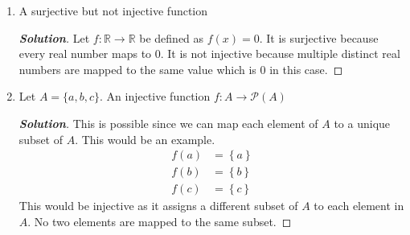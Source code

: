 \documentclass[11pt]{article}
\newenvironment{problem}[2][Problem\!]{\begin{trivlist}
\item[\hskip \labelsep {\bfseries #1}\hskip \labelsep {\bfseries #2.}]}{\end{trivlist}}
\newenvironment{solution}{\begin{proof}[\textbf{\textit{Solution}}]}{\end{proof}}
\newcommand{\set}[1]{\left\{#1\right\}} %
\begin{document}
\begin{problem}{8.1}
\begin{enumerate}
    \item [(d)] A surjective but not injective function
    \begin{solution}
    Let \(f: \mathbb{R} \to \mathbb{R}\) be defined as \(f(x) = 0\). It is surjective because every real number maps to \(0\). It is not injective because multiple distinct real numbers are mapped to the same value which is \(0\) in this case.
    \end{solution}
    \item [(e)] Let \(A = \{a,b,c\}\). An injective function \(f: A \to \mathcal{P}(A)\) 
    \begin{solution}
    This is possible since we can map each element of \(A\) to a unique subset of \(A\). This would be an example.
    \begin{align*}
        f(a) &= \set{a}\\
        f(b) &= \set{b}\\
        f(c) &= \set{c}
    \end{align*}
    This would be injective as it assigns a different subset of \(A\) to each element in \(A\). No two elements are mapped to the same subset.
    \end{solution}
\end{enumerate}
\end{problem}

\newpage %

\end{document}
